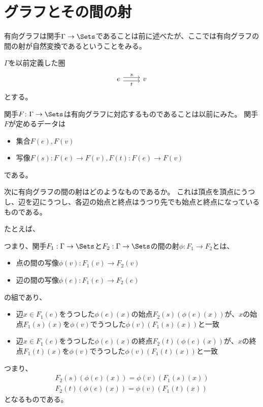 \documentclass{jsarticle}
\begin{document}
\section{グラフとその間の射}
有向グラフは関手$\Gamma \to \Sets$であることは前に述べたが、ここでは有向グラフの間の射が自然変換であるということをみる。

$\Gamma$を以前定義した圏
\[
\begin{tikzcd}
e \ar[r,shift left, "s"] \ar[r, shift right, "t"'] & v
\end{tikzcd}
\]
とする。

関手$F\colon\Gamma\to \Sets$は有向グラフに対応するものであることは以前にみた。
関手$F$が定めるデータは
\begin{itemize}
\item 集合$F(e), F(v)$
\item 写像$F(s)\colon F(e)\to F(v), F(t)\colon F(e)\to F(v)$
\end{itemize}
である。

次に有向グラフの間の射はどのようなものであるか。
これは頂点を頂点にうつし、辺を辺にうつし、各辺の始点と終点はうつり先でも始点と終点になっているものである。

たとえば、

つまり、関手$F_1:\Gamma \to \Sets$と$F_2:\Gamma \to \Sets$の間の射$\phi:F_1 \to F_2$とは、
\begin{itemize}
\item 点の間の写像$\phi(v):F_1(v) \to F_2(v)$
\item 辺の間の写像$\phi(e):F_1(e) \to F_2(e)$
\end{itemize}
の組であり、
\begin{itemize}
\item 辺$x \in F_1(e)$をうつした$\phi(e)(x)$の始点$F_2(s)(\phi(e)(x))$が、$x$の始点$F_1(s)(x)$を$\phi(v)$でうつした$\phi(v)(F_1(s)(x))$と一致
\item 辺$x \in F_1(e)$をうつした$\phi(e)(x)$の終点$F_2(t)(\phi(e)(x))$が、$x$の終点$F_1(t)(x)$を$\phi(v)$でうつした$\phi(v)(F_1(t)(x))$と一致
\end{itemize}
つまり、
\begin{align*}
F_2(s)(\phi(e)(x))=\phi(v)(F_1(s)(x))\\
F_2(t)(\phi(e)(x))=\phi(v)(F_1(t)(x))
\end{align*}
となるものである。
\end{document}
